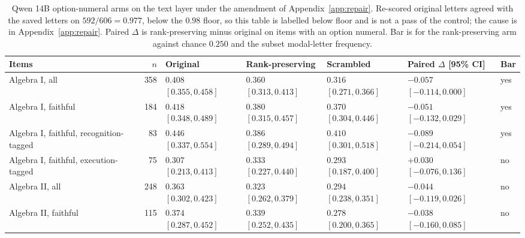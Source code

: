 \begin{table}[t]
  \caption{Qwen 14B option-numeral arms on the text layer under the amendment of Appendix~\ref{app:repair}. Re-scored original letters agreed with the saved letters on $592/606=0.977$, below the $0.98$ floor, so this table is labelled below floor and is not a pass of the control; the cause is in Appendix~\ref{app:repair}. Paired $\Delta$ is rank-preserving minus original on items with an option numeral. Bar is for the rank-preserving arm against chance $0.250$ and the subset modal-letter frequency.}
  \label{tab:amend14b}
  \centering
  \scriptsize
  \begin{tabular}{l r l l l l l}
    \toprule
    Items & $n$ & Original & Rank-preserving & Scrambled & Paired $\Delta$ [95\% CI] & Bar \\
    \midrule
    Algebra I, all & 358 & $0.408$ $[0.355, 0.458]$ & $0.360$ $[0.313, 0.413]$ & $0.316$ $[0.271, 0.366]$ & $-0.057$ $[-0.114, 0.000]$ & yes \\
    Algebra I, faithful & 184 & $0.418$ $[0.348, 0.489]$ & $0.380$ $[0.315, 0.457]$ & $0.370$ $[0.304, 0.446]$ & $-0.051$ $[-0.132, 0.029]$ & yes \\
    Algebra I, faithful, recognition-tagged & 83 & $0.446$ $[0.337, 0.554]$ & $0.386$ $[0.289, 0.494]$ & $0.410$ $[0.301, 0.518]$ & $-0.089$ $[-0.214, 0.054]$ & yes \\
    Algebra I, faithful, execution-tagged & 75 & $0.307$ $[0.213, 0.413]$ & $0.333$ $[0.227, 0.440]$ & $0.293$ $[0.187, 0.400]$ & $+0.030$ $[-0.076, 0.136]$ & no \\
    Algebra II, all & 248 & $0.363$ $[0.302, 0.423]$ & $0.323$ $[0.262, 0.379]$ & $0.294$ $[0.238, 0.351]$ & $-0.044$ $[-0.119, 0.026]$ & no \\
    Algebra II, faithful & 115 & $0.374$ $[0.287, 0.452]$ & $0.339$ $[0.252, 0.435]$ & $0.278$ $[0.200, 0.365]$ & $-0.038$ $[-0.160, 0.085]$ & no \\
    \bottomrule
  \end{tabular}
\end{table}
